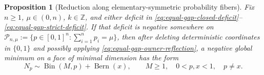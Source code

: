 \documentclass[11pt]{article}
\numberwithin{equation}{section}
\newtheorem{proposition}[theorem]{Proposition}
\theoremstyle{definition}
\theoremstyle{remark}
\DeclareMathOperator{\Bern}{Bern}
\DeclareMathOperator{\Bin}{Bin}
\newcommand{\Z}{\mathbb Z}
\begin{document}
\begin{samepage}
\begin{proposition}[Reduction along elementary-symmetric probability fibers]
\label{prop:equal-gap-one-exception-reduction}
Fix $n\ge1$, $\mu\in(0,n)$, $k\in\Z$, and either deficit in
\eqref{eq:equal-gap-closed-deficit}--\eqref{eq:equal-gap-strict-deficit}.
If that deficit is negative somewhere on $\mathcal P_{n,\mu}:=\{p\in[0,1]^n:\sum_{i=1}^np_i=\mu\}$,
then after deleting deterministic coordinates in $\{0,1\}$ and possibly
applying \eqref{eq:equal-gap-owner-reflection}, a negative global minimum on
a face of minimal dimension has the form
\begin{equation}
 N_p\sim\Bin(M,p)+\Bern(x),
 \qquad M\geq1,\quad 0<p,x<1,\quad p\ne x.
 \label{eq:one-exceptional-family}
\end{equation}
\end{proposition}
\end{samepage}
\end{document}
